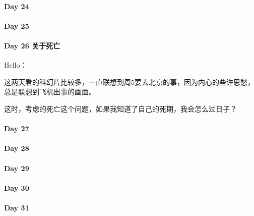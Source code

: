 \documentclass[UTF8,a4paper,8pt]{ctexart}
\begin{document}
 	 \paragraph{Day 24      \quad     }
 	 \paragraph{Day 25      \quad     }
 	 \paragraph{Day 26  关于死亡    \quad     }
	 	 Hello：
	 	 
	 	 这两天看的科幻片比较多，一直联想到周5要去北京的事，因为内心的些许思愁，总是联想到飞机出事的画面。
	 	 
	 	 这时，考虑的死亡这个问题，如果我知道了自己的死期，我会怎么过日子？
 	 \paragraph{Day 27      \quad     }
 	 \paragraph{Day 28      \quad     }
 	 \paragraph{Day 29      \quad     }   
 	 \paragraph{Day 30      \quad     }
 	 \paragraph{Day 31      \quad     }
 		
      
\end{document}
